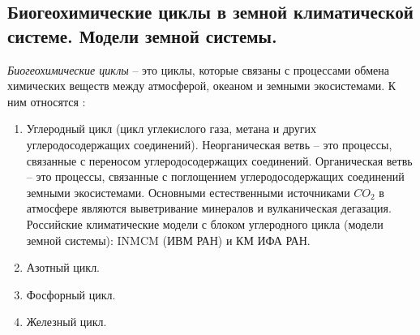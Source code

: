 \subsection{Биогеохимические циклы в земной климатической системе. Модели земной системы.}
\textit{Биогеохимические циклы} -- это циклы, которые связаны с процессами обмена химических веществ между атмосферой, океаном и земными экосистемами.
К ним относятся \cite{Елисеев-2017}:
\begin{enumerate}
\item Углеродный цикл (цикл углекислого газа, метана и других углеродосодержащих соединений). Неорганическая ветвь -- это процессы, связанные с переносом углеродосодержащих соединений. Органическая ветвь -- это процессы, связанные с поглощением углеродосодержащих соединений земными экосистемами. Основными естественными источниками $CO_2$ в атмосфере являются выветривание минералов и вулканическая дегазация. Российские климатические модели с блоком углеродного цикла (модели земной системы): INMCM (ИВМ РАН) и КМ ИФА РАН.
\item Азотный цикл.
\item Фосфорный цикл.
\item Железный цикл.
\end{enumerate}
